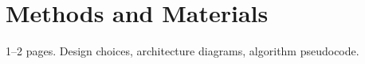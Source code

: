 \section{Methods and Materials}
1--2 pages. Design choices, architecture diagrams, algorithm pseudocode.
